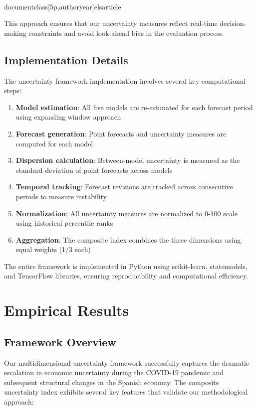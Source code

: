 \\documentclass[5p,authoryear]{elsarticle}
\begin{document}
{This approach ensures that our uncertainty measures reflect real-time decision-making constraints and avoid look-ahead bias in the evaluation process.

\subsection{Implementation Details}

The uncertainty framework implementation involves several key computational steps:

\begin{enumerate}
    \item \textbf{Model estimation}: All five models are re-estimated for each forecast period using expanding window approach
    \item \textbf{Forecast generation}: Point forecasts and uncertainty measures are computed for each model
    \item \textbf{Dispersion calculation}: Between-model uncertainty is measured as the standard deviation of point forecasts across models
    \item \textbf{Temporal tracking}: Forecast revisions are tracked across consecutive periods to measure instability
    \item \textbf{Normalization}: All uncertainty measures are normalized to 0-100 scale using historical percentile ranks
    \item \textbf{Aggregation}: The composite index combines the three dimensions using equal weights (1/3 each)
\end{enumerate}

The entire framework is implemented in Python using scikit-learn, statsmodels, and TensorFlow libraries, ensuring reproducibility and computational efficiency.

\section{Empirical Results}

\subsection{Framework Overview}

Our multidimensional uncertainty framework successfully captures the dramatic escalation in economic uncertainty during the COVID-19 pandemic and subsequent structural changes in the Spanish economy. The composite uncertainty index exhibits several key features that validate our methodological approach:

}
\end{document}
